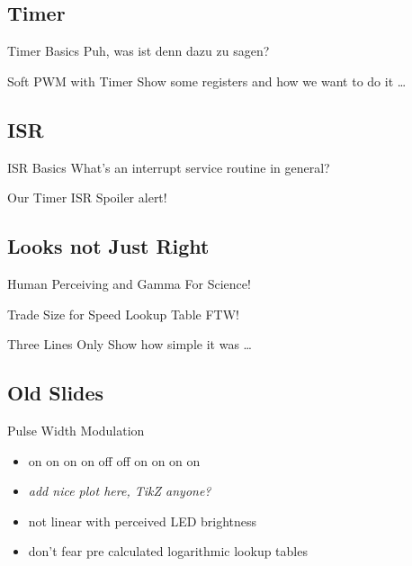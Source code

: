 \documentclass{beamer}
\begin{document}
\subsection{Timer}

\begin{frame}{Timer Basics}
    Puh, was ist denn dazu zu sagen?
\end{frame}

\begin{frame}{Soft PWM with Timer}
    Show some registers and how we want to do it …
\end{frame}

\subsection{ISR}

\begin{frame}{ISR Basics}
    What's an interrupt service routine in general?
\end{frame}

\begin{frame}{Our Timer ISR}
    Spoiler alert!
\end{frame}

\subsection{Looks not Just Right}

\begin{frame}{Human Perceiving and Gamma}
    For Science!
\end{frame}

\begin{frame}{Trade Size for Speed}
    Lookup Table FTW!
\end{frame}

\begin{frame}{Three Lines Only}
    Show how simple it was …
\end{frame}

\subsection{Old Slides}

\begin{frame}{Pulse Width Modulation}
    \begin{itemize}
        \item on on on on off off on on on on
        \pause
        \item \emph{add nice plot here, TikZ anyone?}
        \pause
        \item not linear with perceived LED brightness
        \item don't fear pre calculated logarithmic lookup tables
    \end{itemize}
\end{frame}
\end{document}
